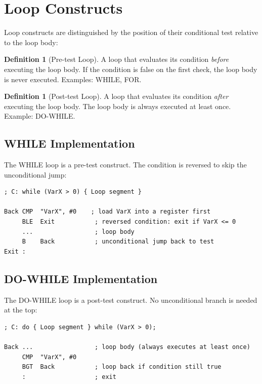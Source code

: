 \documentclass[11pt, a4paper, notitlepage]{report}
\theoremstyle{definition}
\newtheorem{definition}[theorem]{Definition}
\theoremstyle{remark}
\theoremstyle{definition}
\begin{document}
\section{Loop Constructs}

Loop constructs are distinguished by the position of their conditional test relative to the loop body:

\begin{definition}[Pre-test Loop]
\label{def:pretest}
A loop that evaluates its condition \emph{before} executing the loop body. If the condition is false on the first check, the loop body is never executed. Examples: WHILE, FOR\@.
\end{definition}

\begin{definition}[Post-test Loop]
\label{def:posttest}
A loop that evaluates its condition \emph{after} executing the loop body. The loop body is always executed at least once. Example: DO-WHILE\@.
\end{definition}

\subsection{WHILE Implementation}

The WHILE loop is a pre-test construct. The condition is reversed to skip the unconditional jump:

\begin{lstlisting}
; C: while (VarX > 0) { Loop segment }

Back CMP  "VarX", #0    ; load VarX into a register first
     BLE  Exit           ; reversed condition: exit if VarX <= 0
     ...                 ; loop body
     B    Back           ; unconditional jump back to test
Exit :
\end{lstlisting}

\subsection{DO-WHILE Implementation}

The DO-WHILE loop is a post-test construct. No unconditional branch is needed at the top:

\begin{lstlisting}
; C: do { Loop segment } while (VarX > 0);

Back ...                 ; loop body (always executes at least once)
     CMP  "VarX", #0
     BGT  Back           ; loop back if condition still true
     :                   ; exit
\end{lstlisting}
\end{document}
